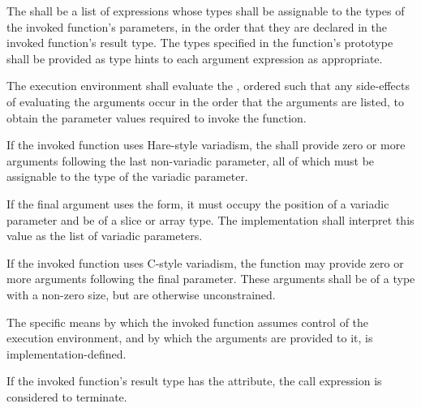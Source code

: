 \specsubsubitem
The  shall be a list of expressions whose types
shall be assignable to the types of the invoked function's parameters, in the
order that they are declared in the invoked function's result type. The types
specified in the function's prototype shall be provided as type hints to each
argument expression as appropriate.

\specsubsubitem
The execution environment shall evaluate the ,
ordered such that any side-effects of evaluating the arguments occur in the
order that the arguments are listed, to obtain the parameter values required to
invoke the function.

\specsubsubitem
If the invoked function uses Hare-style variadism, the
 shall provide zero or more arguments following the
last non-variadic parameter, all of which must be assignable to the type of the
variadic parameter.

\specsubsubitem
If the final argument uses the  form, it must occupy the position of a
variadic parameter and be of a slice or array type. The implementation shall
interpret this value as the list of variadic parameters.

\specsubsubitem
If the invoked function uses C-style variadism, the function may provide zero
or more arguments following the final parameter. These arguments shall be of a
type with a non-zero size, but are otherwise unconstrained.

\specsubsubitem
The specific means by which the invoked function assumes control of the
execution environment, and by which the arguments are provided to it, is
implementation-defined.


\specsubsubitem
If the invoked function's result type has the  attribute,
the call expression is considered to terminate.


